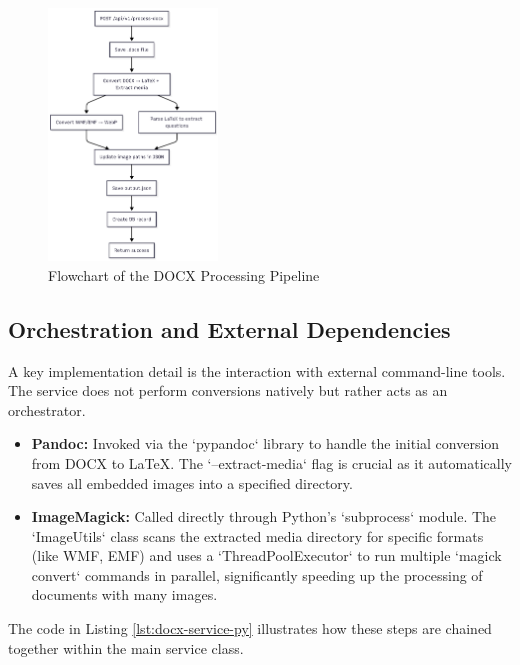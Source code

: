 \begin{figure}[htbp]
\centering
\includegraphics[width=0.4\textwidth]{figures/python-microservice-flow.png}
\caption{Flowchart of the DOCX Processing Pipeline}
\label{fig:python-microservice-flow}
\end{figure}

\FloatBarrier
\subsection{Orchestration and External Dependencies}
A key implementation detail is the interaction with external command-line tools. The service does not perform conversions natively but rather acts as an orchestrator.
\begin{itemize}
    \item \textbf{Pandoc:} Invoked via the `pypandoc` library to handle the initial conversion from DOCX to LaTeX. The `--extract-media` flag is crucial as it automatically saves all embedded images into a specified directory.
    \item \textbf{ImageMagick:} Called directly through Python's `subprocess` module. The `ImageUtils` class scans the extracted media directory for specific formats (like WMF, EMF) and uses a `ThreadPoolExecutor` to run multiple `magick convert` commands in parallel, significantly speeding up the processing of documents with many images.
\end{itemize}

The code in Listing \ref{lst:docx-service-py} illustrates how these steps are chained together within the main service class.

